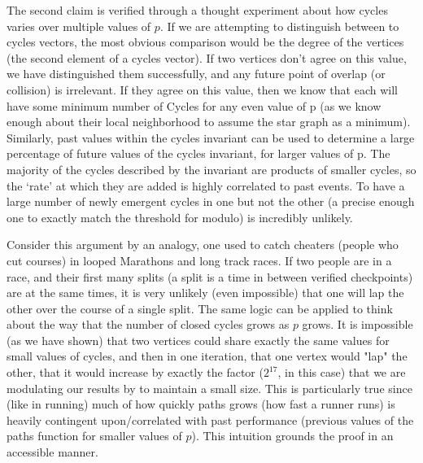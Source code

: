 The second claim is verified through a thought experiment about how cycles varies over multiple values of $p$.
If we are attempting to distinguish between to cycles vectors, the most obvious comparison would be the degree of the vertices (the second element of a cycles vector).
If two vertices don't agree on this value, we have distinguished them successfully, and any future point of overlap (or collision) is irrelevant. 
If they agree on this value, then we know that each will have some minimum number of Cycles for any even value of p (as we know enough about their local neighborhood to assume the star graph as a minimum). 
Similarly, past values within the cycles invariant can be used to determine a large percentage of future values of the cycles invariant, for larger values of p.
The majority of the cycles described by the invariant are products of smaller cycles, so the `rate' at which they are added is highly correlated to past events.
To have a large number of newly emergent cycles in one but not the other (a precise enough one to exactly match the threshold for modulo) is incredibly unlikely.

Consider this argument by an analogy, one used to catch cheaters (people who cut courses) in looped Marathons and long track races.
If two people are in a race, and their first many splits (a split is a time in between verified checkpoints) are at the same times, it is very unlikely (even impossible) that one will lap the other over the course of a single split.
The same logic can be applied to think about the way that the number of closed cycles grows as $p$ grows.
It is impossible (as we have shown) that two vertices could share exactly the same values for small values of cycles, and then in one iteration, that one vertex would "lap" the other, that it would increase by exactly the factor ($2^17$, in this case) that we are modulating our results by to maintain a small size.
This is particularly true since (like in running) much of how quickly paths grows (how fast a runner runs) is heavily contingent upon/correlated with past performance (previous values of the paths function for smaller values of $p$).
This intuition grounds the proof in an accessible manner.


